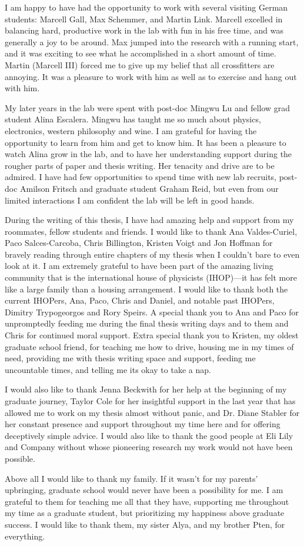 I am happy to have had the opportunity to work with several visiting German students: Marcell Gall, Max Schemmer, and Martin Link. Marcell excelled in balancing hard, productive work in the lab with fun in his free time, and was generally a joy to be around.  Max jumped into the research with a running start, and it was exciting to see what he accomplished in a short amount of time. Martin (Marcell III) forced me to give up my belief that all crossfitters are annoying. It was a pleasure to work with him as well as to exercise and hang out with him. 

My later years in the lab were spent with post-doc Mingwu Lu and fellow grad student Alina Escalera. Mingwu has taught me so much about physics, electronics, western philosophy and wine. I am grateful for having the opportunity to learn from him and get to know him. It has been a pleasure to watch Alina grow in the lab, and to have her understanding support during the rougher parts of paper and thesis writing. Her tenacity and drive are to be admired. I have had few opportunities to spend time with new lab recruits, post-doc Amilson Fritsch and graduate student Graham Reid, but even from our limited interactions I am confident the lab will be left in good hands. 

During the writing of this thesis, I have had amazing help and support from my roommates, fellow students and friends. I would like to thank Ana Valdes-Curiel, Paco Salces-Carcoba, Chris Billington, Kristen Voigt and Jon Hoffman for bravely reading through entire chapters of my thesis when I couldn't bare to even look at it. I am extremely grateful to have been part of the amazing living community that is the international house of physicists (IHOP)---it has felt more like a large family than a housing arrangement. I would like to thank both the current IHOPers, Ana, Paco, Chris and Daniel, and notable past IHOPers, Dimitry Trypogeorgos and Rory Speirs. A special thank you to Ana and Paco for unpromptedly feeding me during the final thesis writing days and to them and Chris for continued moral support. Extra special thank you to Kristen, my oldest graduate school friend, for teaching me how to drive, housing me in my times of need, providing me with thesis writing space and support, feeding me uncountable times, and telling me its okay to take a nap. 

I would also like to thank Jenna Beckwith for her help at the beginning of my graduate journey, Taylor Cole for her insightful support in the last year that has allowed me to work on my thesis almost without panic,  and Dr. Diane Stabler for her constant presence and support throughout my time here and for offering deceptively simple advice. I would also like to thank the good people at Eli Lily and Company without whose pioneering research my work would not have been possible. 

Above all I would like to thank my family. If it wasn't for my parents' upbringing, graduate school would never have been a possibility for me. I am grateful to them for teaching me all that they have, supporting me throughout my time as a graduate student, but prioritizing my happiness above graduate success. I would like to thank them, my sister Alya, and my brother Pten, for everything. 